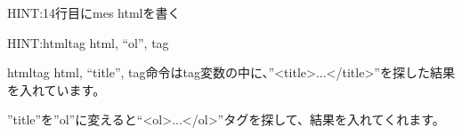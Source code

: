 \documentclass[text08.tex]{subfiles}
\begin{document}

\begin{tcolorbox}[title=\useOmetoi,breakable]\label{Q:mes}
  \begin{enumerate}
    HINT:14行目にmes htmlを書く
  \end{enumerate}
\end{tcolorbox}


\begin{tcolorbox}[title=\useOmetoi,breakable]\label{Q:ol}
  \begin{enumerate}
    HINT:htmltag html, “ol”, tag

    htmltag html, “title”, tag命令はtag変数の中に、”{\textless}title{\textgreater}...{\textless}/title{\textgreater}”を探した結果を入れています。
    
    ”title”を”ol”に変えると“{\textless}ol{\textgreater}...{\textless}/ol{\textgreater}”タグを探して、結果を入れてくれます。
  \end{enumerate}
\end{tcolorbox}


\end{document}

